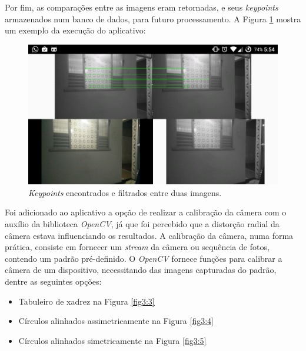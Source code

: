 Por fim, as comparações entre as imagens eram retornadas, e seus \textit{keypoints} armazenados num banco de dados, para futuro processamento. A Figura \ref{fig3:2} mostra um exemplo da execução do aplicativo:

\begin{figure}[H]
	\centering
		\includegraphics[width= \textwidth]{Imagens/figura3-2E4-4.png}
	\caption{\textit{Keypoints} encontrados e filtrados entre duas imagens.}
	\label{fig3:2}
\end{figure}

 
Foi adicionado ao aplicativo a opção de realizar a calibração da câmera com o auxílio da biblioteca \textit{OpenCV}, já que foi percebido que a distorção radial da câmera estava influenciando os resultados. A calibração da câmera, numa forma prática, consiste em fornecer um \textit{stream} da câmera ou sequência de fotos, contendo um padrão pré-definido. O \textit{OpenCV} fornece funções para calibrar a câmera de um dispositivo, necessitando das imagens capturadas do padrão, dentre as seguintes opções:

\begin{itemize}
	\item{Tabuleiro de xadrez na Figura \ref{fig3:3}}
	\item{Círculos alinhados assimetricamente na Figura \ref{fig3:4}}
	\item{Círculos alinhados simetricamente na Figura \ref{fig3:5}}
\end{itemize}

